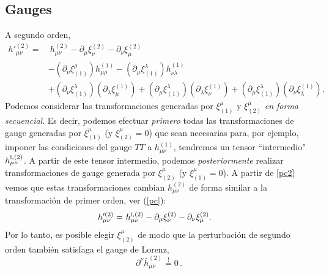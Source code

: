 \subsection{Gauges}
A segundo orden,
\begin{align}\label{pc2}
h'^{(2)}_{\mu\nu} = &\ h^{(2)}_{\mu\nu}- \partial_\mu\xi_\nu^{(2)} - \partial_\nu\xi_\mu^{(2)}\\
&  -(\partial_\nu\xi^\rho_{(1)})h^{(1)}_{\mu\rho} -(\partial_\mu\xi^\lambda_{(1)})h^{(1)}_{\nu\lambda} \\
& +(\partial_\nu\xi^\lambda_{(1)})(\partial_\lambda\xi_\mu^{(1)})
+(\partial_\mu\xi^\lambda_{(1)})(\partial_\lambda\xi_\nu^{(1)})
+(\partial_\mu\xi^\lambda_{(1)})(\partial_\nu\xi_\lambda^{(1)}).
\end{align}
Podemos considerar las transformaciones generadas por $\xi^\mu_{(1)}$ y $\xi^\mu_{(2)}$ \textit{en forma secuencial}. Es decir, podemos efectuar \textit{primero} todas las transformaciones de gauge generadas por $\xi^\mu_{(1)}$ (y $\xi^\mu_{(2)}=0$) que sean necesarias para, por ejemplo, imponer las condiciones del gauge $TT$ a $h^{(1)}_{\mu\nu}$,  tendremos un tensor ``intermedio" $h^{\rm i, (2)}_{\mu\nu}$. A partir de este tensor intermedio, podemos \textit{posteriormente} realizar transformaciones de gauge generada por $\xi^\mu_{(2)}$ (y $\xi^\mu_{(1)}=0$). A partir de \eqref{pc2} vemos que estas transformaciones cambian $h^{(2)}_{\mu\nu}$ de forma similar a la transformación de primer orden, ver (\ref{pc}):
\begin{align}\label{pc2b}
h'^{(2)}_{\mu\nu} = &\ h^{\rm i,(2)}_{\mu\nu}- \partial_\mu\xi_\nu^{(2)} - \partial_\nu\xi_\mu^{(2)}.
\end{align}
Por lo tanto, es posible elegir $\xi^\mu_{(2)}$ de modo que la perturbación de segundo orden también satisfaga el gauge de Lorenz,
\begin{equation} \label{lgauge2}
\partial^\nu\bar{h}^{(2)}_{\mu\nu}\stackrel{!}{=} 0 \, .
\end{equation}

